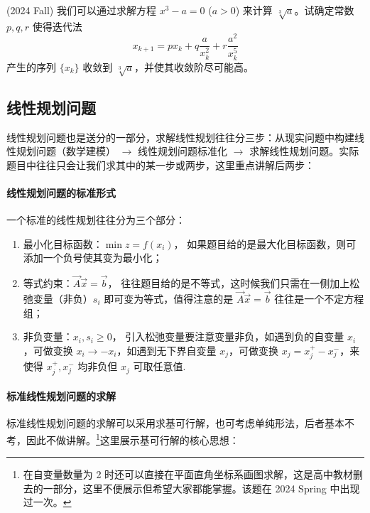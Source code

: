 \begin{problembox}
    \begin{example}
        (2024 Fall)     我们可以通过求解方程 $x^3 - a = 0$ ($a > 0$) 来计算 $\sqrt[3]{a}$。试确定常数 $p, q, r$ 使得迭代法
    \[
    x_{k+1} = px_k + q\frac{a}{x_k^2} + r\frac{a^2}{x_k^5}
    \]
    产生的序列 $\{x_k\}$ 收敛到 $\sqrt[3]{a}$，并使其收敛阶尽可能高。

    \end{example}
    \begin{solution}
        
    \end{solution}
\end{problembox}

\subsection*{线性规划问题}
线性规划问题也是送分的一部分，求解线性规划往往分三步：从现实问题中构建线性规划问题（数学建模） $\to$ 线性规划问题标准化 $\to $ 求解线性规划问题。实际题目中往往只会让我们求其中的某一步或两步，这里重点讲解后两步：
\paragraph{线性规划问题的标准形式}
一个标准的线性规划往往分为三个部分：
\begin{enumerate}
    \item 最小化目标函数：$\min z = f(x_i)$，{\color{red} 如果题目给的是最大化目标函数，则可添加一个负号使其变为最小化}；
    \item 等式约束：$\vec{A} \vec{x} = \vec{b}$，{\color{red} 往往题目给的是不等式，这时候我们只需在一侧加上松弛变量（非负）$s_i$ 即可变为等式}，值得注意的是 $\vec{A}\vec{x} = \vec{b}$ 往往是一个不定方程组；
    \item 非负变量：$x_i,s_i\geqslant 0$，{\color{red} 引入松弛变量要注意变量非负，如遇到负的自变量 $x_i$ ，可做变换 $x_i \to -x_i$，如遇到无下界自变量 $x_j$，可做变换 $x_j = x_j^+ - x_j^-$，来使得 $x_j^+,x_j^-$ 均非负但 $x_j$ 可取任意值}.
\end{enumerate}
\paragraph{标准线性规划问题的求解}
标准线性规划问题的求解可以采用求基可行解，也可考虑单纯形法，后者基本不考，因此不做讲解。\footnote{在自变量数量为 2 时还可以直接在平面直角坐标系画图求解，这是高中教材删去的一部分，这里不便展示但希望大家都能掌握。该题在 2024 Spring 中出现过一次。}这里展示基可行解的核心思想：

